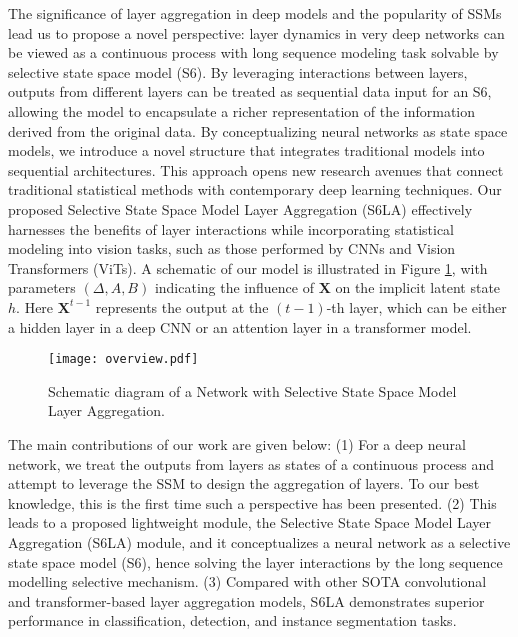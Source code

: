 The significance of layer aggregation in deep models and the popularity of SSMs lead us to propose a novel perspective: layer dynamics in very deep networks can be viewed as a continuous process with long sequence modeling task solvable by selective state space model (S6). By leveraging interactions between layers, outputs from different layers can be treated as sequential data input for an S6, allowing the model to encapsulate a richer representation of the information derived from the original data. 
%
By conceptualizing neural networks as state space models, we introduce a novel structure that integrates traditional models into sequential architectures. This approach opens new research avenues that connect traditional statistical methods with contemporary deep learning techniques. Our proposed Selective State Space Model Layer Aggregation (S6LA) effectively harnesses the benefits of layer interactions while incorporating statistical modeling into vision tasks, such as those performed by CNNs and Vision Transformers (ViTs). A schematic of our model is illustrated in Figure \ref{fig:overview}, with parameters $(\Delta,A,B)$ indicating the influence of {\color{blue}$\boldsymbol{X}$} on the implicit latent state $h$. Here {\color{blue}$\boldsymbol{X}^{t-1}$} represents the output at the $(t-1)$-th layer, which can be either a hidden layer in a deep CNN or an attention layer in a transformer model.

\begin{figure}[t]
\begin{center}
\texttt{[image: overview.pdf]}
\end{center}
\caption{Schematic diagram of a Network with Selective State Space Model Layer Aggregation.}
\label{fig:overview}
\end{figure}

The main contributions of our work are given below: (1) For a deep neural network, we treat the outputs from layers as states of a continuous process and attempt to leverage the SSM to design the aggregation of layers. To our best knowledge, this is the first time such a perspective has been presented. (2) This leads to a proposed lightweight module, the Selective State Space Model Layer Aggregation (S6LA) module, and it conceptualizes a neural network as a selective state space model (S6), hence solving the layer interactions by the long sequence modelling selective mechanism. (3) Compared with other SOTA convolutional and transformer-based layer aggregation models, S6LA demonstrates superior performance in classification, detection, and instance segmentation tasks.

